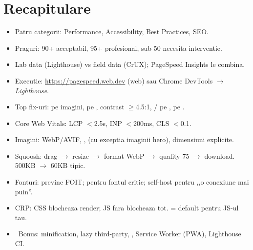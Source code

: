 \section*{Recapitulare}

\begin{recap}
\begin{itemize}[itemsep=1pt]
  \item Patru categorii: Performance, Accessibility, Best Practices, SEO.
  \item Praguri: 90+ acceptabil, 95+ profesional, sub 50 necesita interventie.
  \item Lab data (Lighthouse) vs field data (CrUX); PageSpeed Insights le combina.
  \item Executie: \url{https://pagespeed.web.dev} (web) sau Chrome DevTools $\to$ \emph{Lighthouse}.
  \item Top fix-uri:  pe imagini,  pe , contrast $\geq$4.5:1, / pe ,  pe .
  \item Core Web Vitals: LCP $<$2.5s, INP $<$200ms, CLS $<$0.1.
  \item Imagini: WebP/AVIF, ,  (cu exceptia imaginii hero), dimensiuni explicite.
  \item Squoosh: drag $\to$ resize $\to$ format WebP $\to$ quality 75 $\to$ download. 500KB $\to$ 60KB tipic.
  \item Fonturi:  previne FOIT;  pentru fontul critic; self-host pentru ,,o conexiune mai puin''.
  \item CRP: CSS blocheaza render; JS fara  blocheaza tot.  = default pentru JS-ul tau.
  \item \faRocket\ Bonus: minification, lazy third-party, , Service Worker (PWA), Lighthouse CI.
\end{itemize}
\end{recap}

\partdivider

